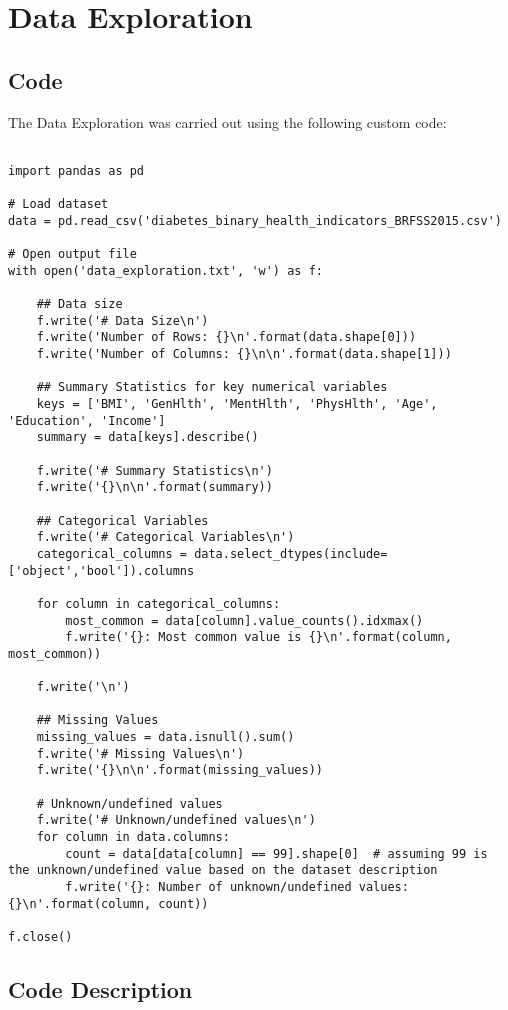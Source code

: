 \documentclass[11pt]{article}
\begin{document}
\section{Data Exploration} \subsection{Code}The Data Exploration was carried out using the following custom code:

\begin{verbatim}

import pandas as pd

# Load dataset
data = pd.read_csv('diabetes_binary_health_indicators_BRFSS2015.csv')

# Open output file
with open('data_exploration.txt', 'w') as f: 
    
    ## Data size
    f.write('# Data Size\n')
    f.write('Number of Rows: {}\n'.format(data.shape[0]))
    f.write('Number of Columns: {}\n\n'.format(data.shape[1]))

    ## Summary Statistics for key numerical variables
    keys = ['BMI', 'GenHlth', 'MentHlth', 'PhysHlth', 'Age', 'Education', 'Income']
    summary = data[keys].describe()

    f.write('# Summary Statistics\n')
    f.write('{}\n\n'.format(summary))

    ## Categorical Variables
    f.write('# Categorical Variables\n')
    categorical_columns = data.select_dtypes(include=['object','bool']).columns
    
    for column in categorical_columns:
        most_common = data[column].value_counts().idxmax()
        f.write('{}: Most common value is {}\n'.format(column, most_common))

    f.write('\n')

    ## Missing Values
    missing_values = data.isnull().sum()
    f.write('# Missing Values\n')
    f.write('{}\n\n'.format(missing_values))

    # Unknown/undefined values
    f.write('# Unknown/undefined values\n')
    for column in data.columns:
        count = data[data[column] == 99].shape[0]  # assuming 99 is the unknown/undefined value based on the dataset description
        f.write('{}: Number of unknown/undefined values: {}\n'.format(column, count))

f.close()

\end{verbatim}

\subsection{Code Description}
\end{document}
